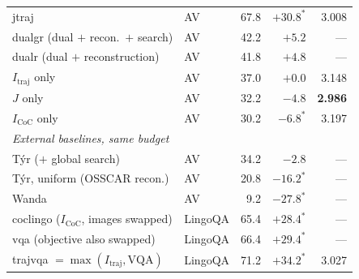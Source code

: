 \begin{table}[t]
\begin{tabular}{llrrr}
jtraj                            & AV      & 67.8 & $+30.8^*$ & 3.008 \\
dualgr (dual $+$ recon.\ $+$ search) & AV  & 42.2 & $+5.2$    & --- \\
dualr (dual $+$ reconstruction)  & AV      & 41.8 & $+4.8$    & --- \\
$I_\mathrm{traj}$ only           & AV      & 37.0 & $+0.0$    & 3.148 \\
$J$ only                         & AV      & 32.2 & $-4.8$    & \textbf{2.986} \\
$I_\mathrm{CoC}$ only            & AV      & 30.2 & $-6.8^*$  & 3.197 \\
\midrule
\multicolumn{5}{l}{\emph{External baselines, same budget}} \\
T\'yr ($+$ global search)      & AV & 34.2 & $-2.8$    & --- \\
T\'yr, uniform (OSSCAR recon.) & AV & 20.8 & $-16.2^*$ & --- \\
Wanda                          & AV &  9.2 & $-27.8^*$ & --- \\
\midrule
coclingo ($I_\mathrm{CoC}$, images swapped) & LingoQA & 65.4 & $+28.4^*$ & --- \\
vqa (objective also swapped)     & LingoQA & 66.4 & $+29.4^*$ & --- \\
trajvqa $=\max(I_\mathrm{traj}, \mathrm{VQA})$ & LingoQA & 71.2 & $+34.2^*$ & 3.027 \\
\bottomrule
\end{tabular}
\end{table}

